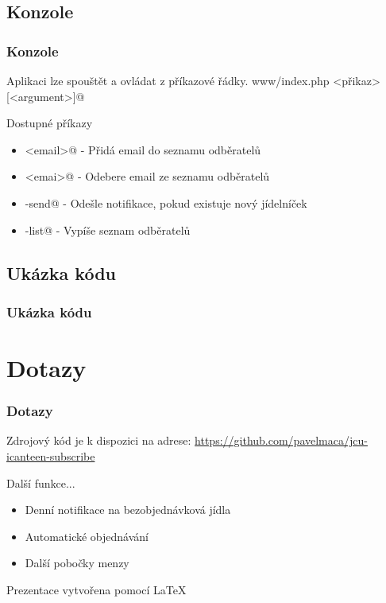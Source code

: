 \documentclass[slidestop]{beamer}
\begin{document}
\subsection{Konzole}
\begin{frame}[containsverbatim]
\frametitle{Konzole}
Aplikaci lze spouštět a ovládat z příkazové řádky.
\vfill
\verb@php www/index.php <přikaz> [<argument>]@
\vfill
\begin{block}{Dostupné příkazy}
  \begin{itemize}
    \item \verb@subscribe <email>@ - Přidá email do seznamu odběratelů
    \item \verb@unsubscribe <emai>@ - Odebere email ze seznamu odběratelů
    \item \verb@notification-send@  - Odešle notifikace, pokud existuje nový jídelníček
    \item \verb@subsciption-list@ - Vypíše seznam odběratelů
  \end{itemize}
\end{block}
\vfill
\end{frame}
\subsection{Ukázka kódu}
\begin{frame}[containsverbatim]
\frametitle{Ukázka kódu}
\begin{figure}[h] %
\begin{center}
\end{center}
\end{figure}
\end{frame}
\section{Dotazy}
\begin{frame}
\frametitle{Dotazy}
\vfill
Zdrojový kód je k dispozici na adrese:
\href{https://github.com/pavelmaca/jcu-icanteen-subscribe}{https://github.com/pavelmaca/jcu-icanteen-subscribe} 

\begin{block}{Další funkce...}
  \begin{itemize}
  \item Denní notifikace na bezobjednávková jídla
  \item Automatické objednávání
  \item Další pobočky menzy
  \end{itemize}
\end{block}
\vfill
\tiny {Prezentace vytvořena pomocí \LaTeX}
\end{frame}
\end{document}
